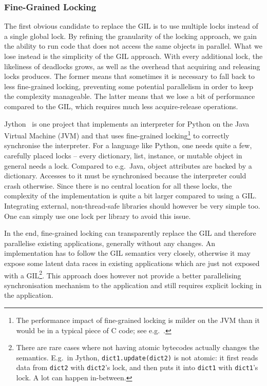 \documentclass{sigplanconf}
\begin{document}
\subsubsection{Fine-Grained Locking}

The first obvious candidate to replace the GIL is to use multiple
locks instead of a single global lock. By refining the granularity of
the locking approach, we gain the ability to run code that does not
access the same objects in parallel. What we lose instead is the
simplicity of the GIL approach. With every additional lock, the
likeliness of deadlocks grows, as well as the overhead that acquiring
and releasing locks produces. The former means that sometimes it is
necessary to fall back to less fine-grained locking, preventing some
potential parallelism in order to keep the complexity manageable.
The latter means that we lose a bit of performance compared to the
GIL, which requires much less acquire-release operations.

Jython~\cite{webjython} is one project that implements an
interpreter for Python on the Java Virtual Machine (JVM) and
that uses fine-grained locking\footnote{The performance impact of
fine-grained locking is milder on the JVM than it would be in a typical piece
of C code; see e.g.~\cite{biased}.} to correctly synchronise the
interpreter. For a language like Python, one needs quite a few,
carefully placed locks -- every dictionary, list, instance, or mutable
object in general needs a lock. Compared to e.g.\ Java, object
attributes are backed by a dictionary. Accesses to it must be
synchronised because the interpreter could crash otherwise.  Since
there is no central location for all these locks, the
complexity of the implementation is quite a bit larger compared to
using a GIL. Integrating external, non-thread-safe libraries should
however be very simple too. One can simply use one lock per library
to avoid this issue.

In the end, fine-grained locking can transparently replace the GIL and
therefore parallelise existing applications, generally without any
changes. An implementation has to follow the GIL semantics very
closely, otherwise it may expose some latent data races in existing
applications which are just not exposed with a GIL\footnote{There are
  rare cases where not having atomic bytecodes actually changes the
  semantics. E.g.\ in Jython, \texttt{dict1.update(dict2)} is not
  atomic: it first reads data from \texttt{dict2} with \texttt{dict2}'s
  lock, and then puts it into \texttt{dict1} with \texttt{dict1}'s
  lock. A lot can happen in-between.}. This approach does however not
provide a better parallelising synchronisation mechanism to the
application and still requires explicit locking in the application.
\end{document}
